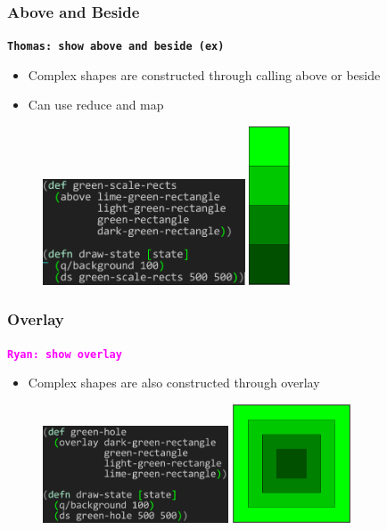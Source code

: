 \documentclass{beamer}
\newcommand{\comment}[1]{{\bf \tt  {#1}}}
\newcommand{\thcomment}[1]{\textcolor{BestBlue}{\comment{Thomas: {#1}}}}
\newcommand{\rmcomment}[1]{\textcolor{magenta}{\comment{Ryan: {#1}}}}
\begin{document}
\begin{frame}
\frametitle{Above and Beside}
\thcomment{show above and beside (ex)}
	\begin{itemize}
		\item Complex shapes are constructed through calling above or beside
		\item Can use reduce and map
	\end{itemize}
	\begin{figure}
	\vspace{-1cm}
	\includegraphics[width=6cm]{PresentationImages/greenScaleRects.png}
	\hspace{1.5cm}
	\includegraphics[width=1.2cm]{PresentationImages/greenScaleTower.png}
	\end{figure}
\end{frame}

\begin{frame}
\frametitle{Overlay}
\rmcomment{show overlay}
	\begin{itemize}
		\item Complex shapes are also constructed through overlay
	\end{itemize}
	\begin{figure}
	\includegraphics[width=5.5cm]{PresentationImages/fcsGreenHoleCode.png}
	\hspace{1cm}
	\includegraphics[width=3.5cm]{PresentationImages/greenHole.png}
	\end{figure}
\end{frame}
\end{document}
